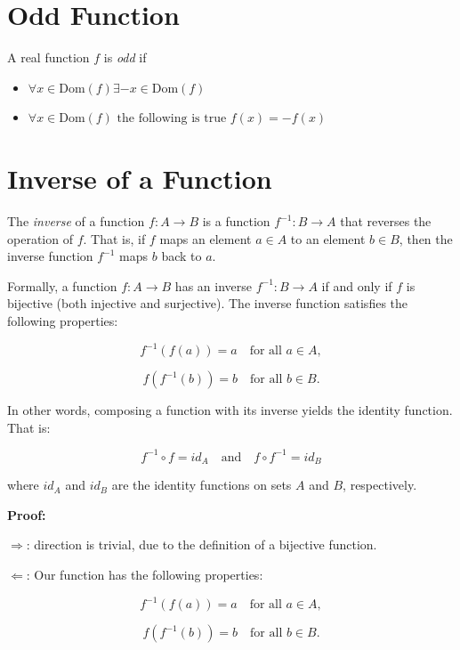 \section{Odd Function}

A real function \(f\) is \emph{odd} if

\begin{itemize}
	
	\item \(\forall x \in \text{Dom}(f) \exists -x \in \text{Dom}(f)\)
	
	\item \(\forall x \in \text{Dom}(f) \text{ the following is true } f(x) = - f(x)\)

\end{itemize}

\section{Inverse of a Function}

The \emph{inverse} of a function \(f: A \to B\) is a function \(f^{-1}: B \to A\) that 
reverses the operation of \(f\). That is, if \(f\) maps an element \(a \in A\) to an 
element \(b \in B\), then the inverse function \(f^{-1}\) maps \(b\) back to \(a\).

Formally, a function \(f: A \to B\) has an inverse \(f^{-1}: B \to A\)  
if and only if \(f\) is bijective (both injective and surjective). The inverse function satisfies the 
following properties:

\[
	f^{-1}(f(a)) = a \quad \text{for all } a \in A,
\]

\[
	f(f^{-1}(b)) = b \quad \text{for all } b \in B.
\]

In other words, composing a function with its inverse yields the identity function. That is:

\[
	f^{-1} \circ f = id_A \quad \text{and} \quad f \circ f^{-1} = id_B
\]

where \(id_A\) and \(id_B\) are the identity functions on sets \(A\) and \(B\), respectively.

\textbf{Proof:}

\(\Rightarrow\): direction is trivial, due to the definition of a bijective function. 

\(\Leftarrow\): Our function has the following properties:

\[
	f^{-1}(f(a)) = a \quad \text{for all } a \in A,
\]

\[
	f(f^{-1}(b)) = b \quad \text{for all } b \in B.
\]

